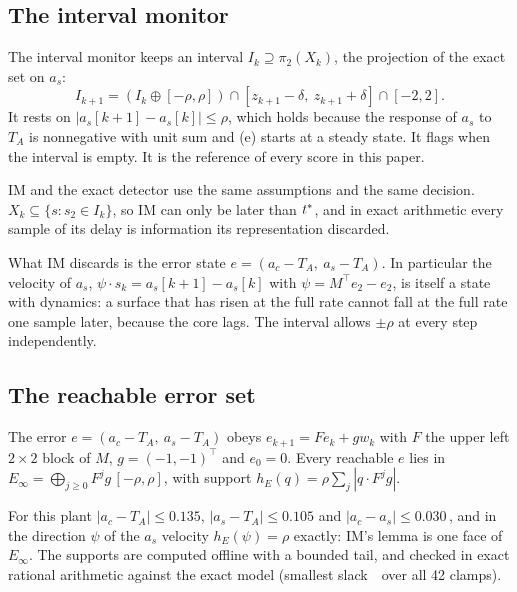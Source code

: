 \subsection{The interval monitor}\label{sec:im}

The interval monitor keeps an interval $I_k\supseteq\pi_2(X_k)$, the projection of the exact set on $a_s$:
\[
I_{k+1} = (I_k\oplus[-\rho,\rho])\cap[z_{k+1}-\delta,\ z_{k+1}+\delta]\cap[-2,2].
\]
It rests on $|a_s[k+1]-a_s[k]|\le\rho$, which holds because the response of $a_s$ to $T_A$ is nonnegative with unit sum
and (e) starts at a steady state. It flags when the interval is empty. It is the reference of every score in this
paper.

\begin{corollary}\label{cor:im}
IM and the exact detector use the same assumptions and the same decision. $X_k\subseteq\{s : s_2\in I_k\}$, so IM can
only be later than $t^{\ast}$, and in exact arithmetic every sample of its delay is information its representation
discarded.
\end{corollary}

What IM discards is the error state $e = (a_c - T_A,\ a_s - T_A)$. In particular the velocity of $a_s$,
$\psi\cdot s_k = a_s[k+1]-a_s[k]$ with $\psi = M^\top e_2 - e_2$, is itself a state with dynamics: a surface that has risen at
the full rate cannot fall at the full rate one sample later, because the core lags. The interval allows $\pm\rho$ at
every step independently.

\subsection{The reachable error set}

\begin{lemma}\label{lem:err}
The error $e = (a_c - T_A,\ a_s - T_A)$ obeys $e_{k+1} = F e_k + g w_k$ with $F$ the upper left $2\times2$ block of $M$,
$g = (-1,-1)^\top$ and $e_0 = 0$. Every reachable $e$ lies in $E_\infty = \bigoplus_{j\ge0}F^j g\,[-\rho,\rho]$, with
support $h_E(q) = \rho\sum_j|q\cdot F^j g|$.
\end{lemma}

For this plant $|a_c - T_A|\le 0.135$, $|a_s - T_A|\le 0.105$ and $|a_c - a_s|\le 0.030$\,\degC, and in the direction
$\psi$ of the $a_s$ velocity $h_E(\psi) = \rho$ exactly: IM's lemma is one face of $E_\infty$. The supports are computed offline with
a bounded tail, and checked in exact rational arithmetic against the exact model (smallest slack \,\degC\
over all 42 clamps).

